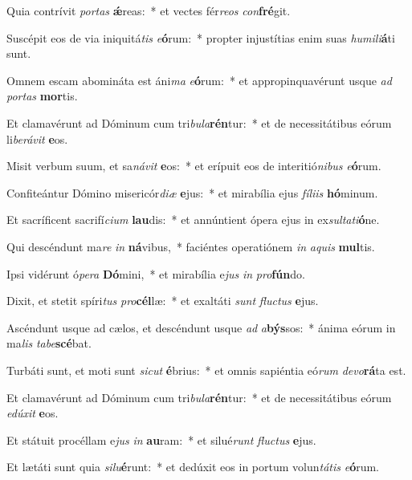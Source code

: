 \item Quia contrívit \textit{por}\textit{tas} \textbf{ǽ}reas:~* et vectes fér\textit{re}\textit{os} \textit{con}\textbf{fré}git.
\item Suscépit eos de via iniquitá\textit{tis} \textit{e}\textbf{ó}rum:~* propter injustítias enim suas \textit{hu}\textit{mi}\textit{li}\textbf{á}ti sunt.
\item Omnem escam abomináta est áni\textit{ma} \textit{e}\textbf{ó}rum:~* et appropinquavérunt usque \textit{ad} \textit{por}\textit{tas} \textbf{mor}tis.
\item Et clamavérunt ad Dóminum cum tri\textit{bu}\textit{la}\textbf{rén}tur:~* et de necessitátibus eórum li\textit{be}\textit{rá}\textit{vit} \textbf{e}os.
\item Misit verbum suum, et sa\textit{ná}\textit{vit} \textbf{e}os:~* et erípuit eos de interitió\textit{ni}\textit{bus} \textit{e}\textbf{ó}rum.
\item Confiteántur Dómino misericór\textit{di}\textit{æ} \textbf{e}jus:~* et mirabília ejus \textit{fí}\textit{li}\textit{is} \textbf{hó}minum.
\item Et sacríficent sacrifí\textit{ci}\textit{um} \textbf{lau}dis:~* et annúntient ópera ejus in ex\textit{sul}\textit{ta}\textit{ti}\textbf{ó}ne.
\item Qui descéndunt ma\textit{re} \textit{in} \textbf{ná}vibus,~* faciéntes operatiónem \textit{in} \textit{a}\textit{quis} \textbf{mul}tis.
\item Ipsi vidérunt ó\textit{pe}\textit{ra} \textbf{Dó}mini,~* et mirabília e\textit{jus} \textit{in} \textit{pro}\textbf{fún}do.
\item Dixit, et stetit spíri\textit{tus} \textit{pro}\textbf{cél}læ:~* et exaltáti \textit{sunt} \textit{fluc}\textit{tus} \textbf{e}jus.
\item Ascéndunt usque ad cælos, et descéndunt usque \textit{ad} \textit{a}\textbf{býs}sos:~* ánima eórum in ma\textit{lis} \textit{ta}\textit{be}\textbf{scé}bat.
\item Turbáti sunt, et moti sunt \textit{sic}\textit{ut} \textbf{é}brius:~* et omnis sapiéntia eó\textit{rum} \textit{de}\textit{vo}\textbf{rá}ta est.
\item Et clamavérunt ad Dóminum cum tri\textit{bu}\textit{la}\textbf{rén}tur:~* et de necessitátibus eórum \textit{e}\textit{dú}\textit{xit} \textbf{e}os.
\item Et státuit procéllam e\textit{jus} \textit{in} \textbf{au}ram:~* et silué\textit{runt} \textit{fluc}\textit{tus} \textbf{e}jus.
\item Et lætáti sunt quia \textit{si}\textit{lu}\textbf{é}runt:~* et dedúxit eos in portum volun\textit{tá}\textit{tis} \textit{e}\textbf{ó}rum.
